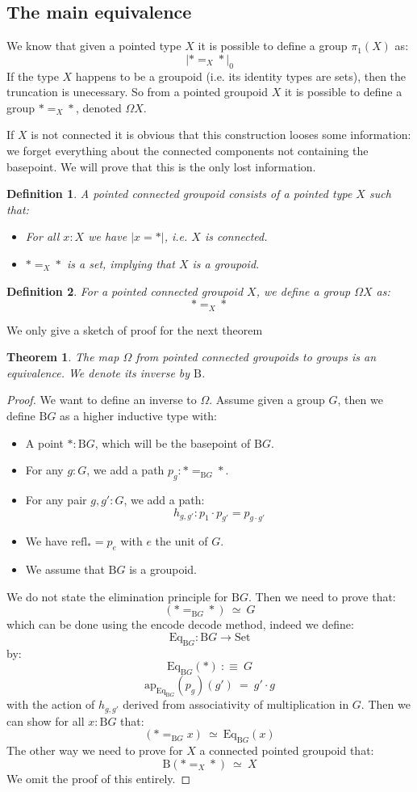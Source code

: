 \documentclass{article}
\newcommand{\sse}[1]{\medbreak \subsection{#1}}
\renewcommand{\r}{\rightarrow}
\newcommand{\ap}{\mathrm{ap}}
\newcommand{\refl}{\mathrm{refl}}
\newcommand{\B}{\mathrm{B}}
\newcommand{\Set}{\mathrm{Set}}
\newcommand{\Eq}{\mathrm{Eq}}
\newtheorem{definition}{Definition}
\newtheorem{theorem}{Theorem}
\begin{document}
\sse{The main equivalence}

We know that given a pointed type $X$ it is possible to define a group $\pi_1(X)$ as: 
\[|*=_X*|_0\] If the type $X$ happens to be a groupoid (i.e. its identity types are sets), then the truncation is unecessary. So from a pointed groupoid $X$ it is possible to define a group $*=_X*$, denoted $\Omega X$. 

If $X$ is not connected it is obvious that this construction looses some information: we forget everything about the connected components not containing the basepoint. We will prove that this is the only lost information.

\begin{definition}
A pointed connected groupoid consists of a pointed type $X$ such that:
\begin{itemize}
\item For all $x:X$ we have $|x=*|$, i.e. $X$ is connected.
\item $*=_{X}*$ is a set, implying that $X$ is a groupoid.
\end{itemize}
\end{definition}

\begin{definition}
For a pointed connected groupoid $X$, we define a group $\Omega X$ as:
\[*=_X*\]
\end{definition}

We only give a sketch of proof for the next theorem

\begin{theorem}
The map $\Omega$ from pointed connected groupoids to groups is an equivalence. We denote its inverse by $\B$.
\end{theorem}
\begin{proof}
We want to define an inverse to $\Omega$. Assume given a group $G$, then we define $\B G$ as a higher inductive type with:
\begin{itemize}
\item A point $*:\B G$, which will be the basepoint of $\B G$.
\item For any $g:G$, we add a path $p_g : *=_{\B G}*$.
\item For any pair $g,g':G$, we add a path:
\[h_{g,g'} : p_1 \cdot p_{g'} = p_{g\cdot g'}\]
\item We have $\refl_* = p_e$ with $e$ the unit of $G$.
\item We assume that $\B G$ is a groupoid.
\end{itemize}
We do not state the elimination principle for $\B G$. Then we need to prove that: 
\[(*=_{\B G}*)\ \simeq\ G \]
which can be done using the encode decode method, indeed we define: 
\[\Eq_{\B G} : \B G \r \Set\] 
by:
\[\Eq_{\B G}(*)\ :\equiv\ G\]
\[\ap_{\Eq_{\B G}}(p_g)(g') \ = \ g'\cdot g\]
with the action of $h_{g,g'}$ derived from associativity of multiplication in $G$. Then we can show for all $x:\B G$ that:
\[(*=_{\B G}x)\ \simeq\ \Eq_{\B G}(x) \]
The other way we need to prove for $X$ a connected pointed groupoid that:
\[\B(*=_X*) \ \simeq\ X\]
We omit the proof of this entirely.
\end{proof}
\end{document}

